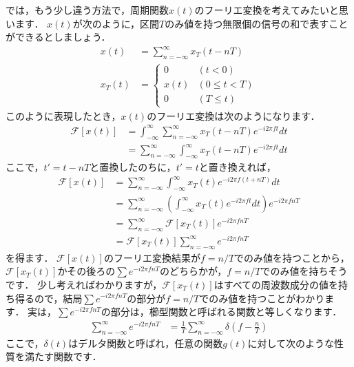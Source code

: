 では，もう少し違う方法で，周期関数$x(t)$のフーリエ変換を考えてみたいと思います．
$x(t)$が次のように，区間$T$のみ値を持つ無限個の信号の和で表すことができるとしましょう．
\begin{align}
x(t) &= \sum_{n=-\infty}^{\infty} x_T(t - nT) \\
x_T(t) &=   \begin{cases}
                0    & (t < 0) \\
                x(t) & (0 \leq t < T) \\
                0    & (T \leq t)
            \end{cases}
\end{align}
このように表現したとき，$x(t)$のフーリエ変換は次のようになります．
\begin{align}
\mathcal{F}[x(t)]   &= \int_{-\infty}^{\infty} \sum_{n=-\infty}^{\infty} x_T(t - nT) e^{-i2\pi f t} dt \nonumber\\
                    &= \sum_{n=-\infty}^{\infty} \int_{-\infty}^{\infty} x_T(t - nT) e^{-i2\pi f t} dt
\end{align}
ここで，$t'=t-nT$と置換したのちに，$t'=t$と置き換えれば，
\begin{align}
\mathcal{F}[x(t)]   &= \sum_{n=-\infty}^{\infty} \int_{-\infty}^{\infty} x_T(t) e^{-i2\pi f (t+nT)} dt \nonumber\\
                    &= \sum_{n=-\infty}^{\infty} \left( \int_{-\infty}^{\infty} x_T(t) e^{-i2\pi f t} dt \right) e^{-i2 \pi f nT} \nonumber\\
                    &= \sum_{n=-\infty}^{\infty} \mathcal{F}[x_T(t)] e^{-i2 \pi f nT} \nonumber\\
                    &= \mathcal{F}[x_T(t)] \sum_{n=-\infty}^{\infty}  e^{-i2 \pi f nT}
\end{align}
を得ます．
$\mathcal{F}[x(t)]$のフーリエ変換結果が$f=n/T$でのみ値を持つことから，$\mathcal{F}[x_T(t)]$かその後ろの$\sum e^{-i2 \pi f nT}$のどちらかが，$f=n/T$でのみ値を持ちそうです．
少し考えればわかりますが，$\mathcal{F}[x_T(t)]$はすべての周波数成分の値を持ち得るので，結局$\sum e^{-i2 \pi f nT}$の部分が$f=n/T$でのみ値を持つことがわかります．
実は，$\sum e^{-i2 \pi f nT}$の部分は，櫛型関数と呼ばれる関数と等しくなります．
\begin{align}
\sum_{n=-\infty}^{\infty}  e^{-i2 \pi f nT} &= \frac{1}{T} \sum_{n=-\infty}^{\infty} \delta\left(f - \frac{n}{T}\right) \label{eq:comb_function}
\end{align}
ここで，$\delta(t)$はデルタ関数と呼ばれ，任意の関数$g(t)$に対して次のような性質を満たす関数です．
